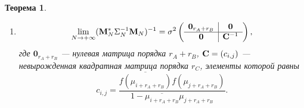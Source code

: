 \documentclass[12pt,a4paper]{article}
\newtheorem{theorem}{Теорема}
\begin{document}
\begin{theorem}
\begin{enumerate}
		\item 
		\begin{equation*}
		\lim_{N \to + \infty} (\mathbf{M}_N^* \Sigma_N^{-1} \mathbf{M}_N)^{-1} = \sigma^2 \left( \begin{array}{c|c}
		\mathbf{0}_{r_A + r_B} & \mathbf{0} \\ \hline
		\mathbf{0} & \mathbf{C}^{-1}
		\end{array}  \right),
		\end{equation*}
		где $\mathbf{0}_{r_A + r_B}$ --- нулевая матрица порядка $r_A + r_B$, $\mathbf{C} = (c_{i,j})$ --- невырожденная квадратная матрица порядка $r_C$, элементы которой равны
		\begin{equation*}
		c_{i, j} = \frac{\overline{f(\mu_{i + r_A + r_B})} f(\mu_{j + r_A + r_B})}{1 - \overline{\mu_{i+r_A+r_B}} \mu_{j+r_A+r_B}}.
		\end{equation*}
	\end{enumerate}
\end{theorem}
\end{document}
